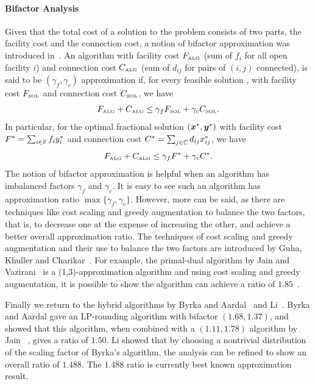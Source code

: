\documentclass[oneside,final]{ucr}
\begin{document}
\paragraph{Bifactor Analysis}
Given that the total cost of a solution to the {\UFL}
problem consists of two parts, the facility cost and the
connection cost, a notion of bifactor approximation was
introduced in~\cite{JainMMSV03}. An algorithm with facility
cost $F_{\mbox{\tiny\rm ALG}}$ (sum of $f_i$ for all open facility
$i$) and connection cost $C_{\mbox{\tiny\rm ALG}}$ (sum of $d_{ij}$
for pairs of $(i,j)$ connected), is said to be
$(\gamma_f,\gamma_c)$ approximation if, for every feasible
solution {\SOL}, with facility cost $F_{{{\mbox{\tiny\rm SOL}}}}$ and
connection cost $C_{{{\mbox{\tiny\rm SOL}}}}$, we have
\begin{equation*}
  F_{\mbox{\tiny\rm ALG}} + C_{\mbox{\tiny\rm ALG}} \leq \gamma_f F_{{{\mbox{\tiny\rm SOL}}}} +
  \gamma_c C_{{{\mbox{\tiny\rm SOL}}}}.
\end{equation*}
In particular, for the optimal fractional solution
$(\boldsymbol{x}^\ast,\boldsymbol{y}^\ast)$ with facility cost $F^\ast =
\sum_{i\in\mathbb{F}} f_i y_i^\ast$ and connection cost
$C^\ast = \sum_{j\in\mathbb{C}} d_{ij} x_{ij}^\ast$, we have
\begin{equation*}
  F_{\mbox{\tiny\rm ALG}} + C_{\mbox{\tiny\rm ALG}} \leq \gamma_f F^\ast +
  \gamma_c C^\ast.
\end{equation*}
The notion of bifactor approximation is helpful when an
algorithm has imbalanced factors $\gamma_f$ and
$\gamma_c$. It is easy to see such an algorithm has
approximation ratio $\max\{\gamma_f, \gamma_c\}$. However,
more can be said, as there are techniques like cost scaling
and greedy augmentation to balance the two factors, that is,
to decrease one at the expense of increasing the other, and
achieve a better overall approximation ratio. The techniques
of cost scaling and greedy augmentation and their use to
balance the two factors are introduced by Guha, Khuller and
Charikar~\cite{GuhaK98, CharikarG05}. For example, the
primal-dual algorithm by Jain and Vazirani~\cite{JainV03} is
a (1,3)-approximation algorithm and using cost scaling and
greedy augmentation, it is possible to show the algorithm
can achieve a ratio of $1.85$~\cite{CharikarG05}.

Finally we return to the hybrid algorithms by Byrka and
Aardal~\cite{ByrkaA10} and Li~\cite{Li11}. Byrka and Aardal
gave an LP-rounding algorithm with bifactor $(1.68,1.37)$,
and showed that this algorithm, when combined with a
$(1.11,1.78)$ algorithm by Jain {\etal}~\cite{JainMMSV03},
gives a ratio of $1.50$. Li showed that by choosing a
nontrivial distribution of the scaling factor of Byrka's
algorithm, the analysis can be refined to show an overall
ratio of $1.488$. The $1.488$ ratio is currently best known
approximation result.
\end{document}
